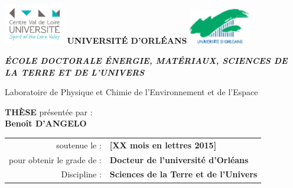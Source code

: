 {\parindent0pt %

\includegraphics[width=0.2\textwidth, valign=c]{./images/pucvl}
\hfill
{\LARGE\textbf{UNIVERSITÉ D'ORLÉANS}}
\hfill
\includegraphics[width=0.2\textwidth, valign=c]{./images/univ}

\begin{center}
	{\large\textit{\textbf{ÉCOLE DOCTORALE ÉNERGIE, MATÉRIAUX, SCIENCES DE LA TERRE ET DE L'UNIVERS}}}\\

	\vspace{1.1cm}

	{\large Laboratoire de Physique et Chimie de l'Environnement et de l'Espace} \\

	\vspace{1.1cm}

	{\Large\textbf{THÈSE}} présentée par :\\
	{\Large\textbf{Benoît D'ANGELO}}\\

	\vspace{1.1cm}

	\begin{tabular}{r l}
		soutenue le : & \textbf{[XX mois en lettres 2015]} \\ [.8cm]
		pour obtenir le grade de : & \textbf{Docteur de l'universit\'e d'Orl\'eans}\\[.2cm]
		Discipline : &  \textbf{Sciences de la Terre et de l'Univers}\\
	\end{tabular}
\end{center}

}
